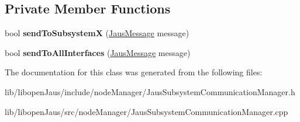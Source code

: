 \subsection*{\-Private \-Member \-Functions}
\begin{DoxyCompactItemize}
\item 
\hypertarget{class_jaus_subsystem_communication_manager_a367729e657a5213fba65318e2d168d9e}{bool {\bfseries send\-To\-Subsystem\-X} (\hyperlink{struct_jaus_message_struct}{\-Jaus\-Message} message)}\label{class_jaus_subsystem_communication_manager_a367729e657a5213fba65318e2d168d9e}

\item 
\hypertarget{class_jaus_subsystem_communication_manager_a9e219fc709dbddedb9443b0db7c1b3c0}{bool {\bfseries send\-To\-All\-Interfaces} (\hyperlink{struct_jaus_message_struct}{\-Jaus\-Message} message)}\label{class_jaus_subsystem_communication_manager_a9e219fc709dbddedb9443b0db7c1b3c0}

\end{DoxyCompactItemize}


\-The documentation for this class was generated from the following files\-:\begin{DoxyCompactItemize}
\item 
lib/libopen\-Jaus/include/node\-Manager/\-Jaus\-Subsystem\-Communication\-Manager.\-h\item 
lib/libopen\-Jaus/src/node\-Manager/\-Jaus\-Subsystem\-Communication\-Manager.\-cpp\end{DoxyCompactItemize}
